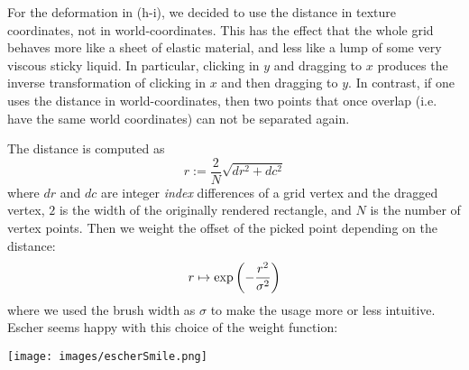 \documentclass{scrartcl}
\begin{document}
For the deformation in (h-i), we decided to use the distance in texture coordinates,
not in world-coordinates. 
This has the effect that the whole grid behaves more like a sheet of elastic
material, and less like a lump of some very viscous sticky liquid. 
In particular, clicking in $y$ and
dragging to $x$ produces the inverse transformation of clicking in $x$ and then 
dragging to $y$. In contrast, if one uses the distance in world-coordinates, then two
points that once overlap (i.e. have the same world coordinates) can not be separated again.

The distance is computed as
\[
  r := \frac{2}{N} \sqrt{dr^2 + dc^2}  
\]
where $dr$ and $dc$ are integer \emph{index} differences of a grid vertex and the dragged vertex, 
$2$ is the width of the originally rendered rectangle, and $N$ is the number of vertex points.
Then we weight the offset of the picked point depending on the distance:
\[
  r \mapsto \exp\left({-\frac{r^2}{\sigma^2}}\right)
\]
where we used the brush width as $\sigma$ to make the usage more or less intuitive.
Escher seems happy with this choice of the weight function:

\centering\texttt{[image: images/escherSmile.png]}
\end{document}
